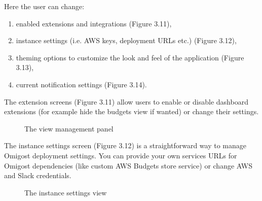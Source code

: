 \documentclass[licencjacka,en]{thesisclass}
\begin{document}
    Here the user can change:
    \begin{enumerate}
        \item enabled extensions and integrations (Figure 3.11),
        \item instance settings (i.e. AWS keys, deployment URLs etc.) (Figure 3.12),
        \item theming options to customize the look and feel of the application (Figure 3.13),
        \item current notification settings (Figure 3.14).
    \end{enumerate}
    
    The extension screens (Figure 3.11) allow users to enable or disable
    dashboard extensions (for example hide the budgets view if wanted) or change their settings.
    
    \begin{figure}[!htbp]
      \caption{The view management panel\label{fig:scr-extensions}}
    \end{figure}
    
    The instance settings screen (Figure 3.12) is a straightforward way to manage
    Omigost deployment settings. You can provide your own services URLs for Omigost dependencies
    (like custom AWS Budgets store service) or change AWS and Slack credentials.
    
    \begin{figure}[!htbp]
      \caption{The instance settings view\label{fig:scr-instance-settings}}
    \end{figure}
    
\end{document}
